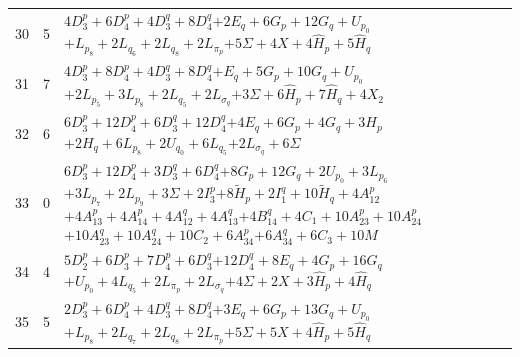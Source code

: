 \documentclass[11pt,a4paper]{article}
\theoremstyle{remark}
\begin{document}
\begin{longtable}{rrp{12.7cm}}
30&5&\( 4D_3^p + 6D_4^p + 4D_3^q + 8D_4^q \)\newline\( + 2E_q + 6G_p + 12G_q + U_{p_{0}} \)\newline\( + L_{p_{8}} + 2L_{q_{6}} + 2L_{q_{8}} + 2L_{\pi_p} \)\newline\( + 5\Sigma + 4X + 4\widehat H_p + 5\widehat H_q \)\\[3pt]
31&7&\( 4D_3^p + 8D_4^p + 4D_3^q + 8D_4^q \)\newline\( + E_q + 5G_p + 10G_q + U_{p_{0}} \)\newline\( + 2L_{p_{5}} + 3L_{p_{8}} + 2L_{q_{5}} + 2L_{\sigma_q} \)\newline\( + 3\Sigma + 6\widehat H_p + 7\widehat H_q + 4X_2 \)\\[3pt]
32&6&\( 6D_3^p + 12D_4^p + 6D_3^q + 12D_4^q \)\newline\( + 4E_q + 6G_p + 4G_q + 3H_p \)\newline\( + 2H_q + 6L_{p_{8}} + 2U_{q_{0}} + 6L_{q_{5}} \)\newline\( + 2L_{\sigma_q} + 6\Sigma \)\\[3pt]
33&0&\( 6D_3^p + 12D_4^p + 3D_3^q + 6D_4^q \)\newline\( + 8G_p + 12G_q + 2U_{p_{0}} + 3L_{p_{6}} \)\newline\( + 3L_{p_{7}} + 2L_{p_{9}} + 3\Sigma + 2I_3^p \)\newline\( + 8\widetilde H_p + 2I_1^q + 10\widetilde H_q + 4A_{12}^p \)\newline\( + 4A_{13}^p + 4A_{14}^p + 4A_{12}^q + 4A_{13}^q \)\newline\( + 4B_{14}^q + 4C_1 + 10A_{23}^p + 10A_{24}^p \)\newline\( + 10A_{23}^q + 10A_{24}^q + 10C_2 + 6A_{34}^p \)\newline\( + 6A_{34}^q + 6C_3 + 10M \)\\[3pt]
34&4&\( 5D_2^p + 6D_3^p + 7D_4^p + 6D_3^q \)\newline\( + 12D_4^q + 8E_q + 4G_p + 16G_q \)\newline\( + U_{p_{0}} + 4L_{q_{5}} + 2L_{\pi_p} + 2L_{\sigma_q} \)\newline\( + 4\Sigma + 2X + 3\widehat H_p + 4\widehat H_q \)\\[3pt]
35&5&\( 2D_3^p + 6D_4^p + 4D_3^q + 8D_4^q \)\newline\( + 3E_q + 6G_p + 13G_q + U_{p_{0}} \)\newline\( + L_{p_{8}} + 2L_{q_{7}} + 2L_{q_{8}} + 2L_{\pi_p} \)\newline\( + 5\Sigma + 5X + 4\widehat H_p + 5\widehat H_q \)\\[3pt]

\end{longtable}
\end{document}
